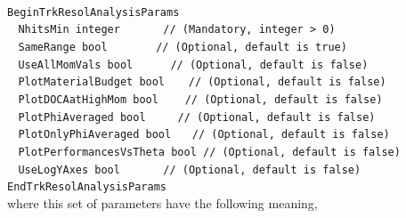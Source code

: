 ~\\
\noindent
{\tt BeginTrkResolAnalysisParams} \\
$~~~~${\tt NhitsMin                 integer    $~~~~~~~~~~~$ // (Mandatory, integer > 0)} \\
$~~~~${\tt SameRange                bool     $~~~~~~~~~~~~~$ // (Optional, default is true) } \\
$~~~~${\tt UseAllMomVals            bool         $~~~~~~~~~$ // (Optional, default is false)} \\
$~~~~${\tt PlotMaterialBudget       bool              $~~~~$ // (Optional, default is false)} \\
$~~~~${\tt PlotDOCAatHighMom        bool             $~~~~~$ // (Optional, default is false)} \\
$~~~~${\tt PlotPhiAveraged          bool           $~~~~~~~$ // (Optional, default is false)} \\
$~~~~${\tt PlotOnlyPhiAveraged      bool               $~~~$ // (Optional, default is false)} \\
$~~~~${\tt PlotPerformancesVsTheta  bool                     // (Optional, default is false)} \\
$~~~~${\tt UseLogYAxes              bool       $~~~~~~~~~~~$ // (Optional, default is false)} \\
{\tt EndTrkResolAnalysisParams} \\

\noindent
where this set of parameters have the following meaning,

